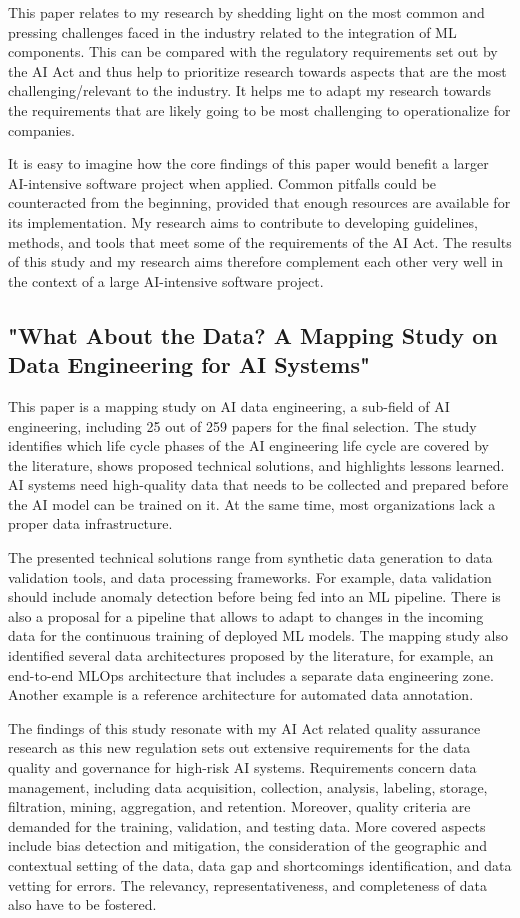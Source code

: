 \documentclass[titlepage,11pt]{article}
\begin{document}
This paper relates to my research by shedding light on the most common and pressing challenges faced in the industry related to the integration of ML components. This can be compared with the regulatory requirements set out by the AI Act and thus help to prioritize research towards aspects that are the most challenging/relevant to the industry. It helps me to adapt my research towards the requirements that are likely going to be most challenging to operationalize for companies. 

It is easy to imagine how the core findings of this paper would benefit a larger AI-intensive software project when applied. Common pitfalls could be counteracted from the beginning, provided that enough resources are available for its implementation. My research aims to contribute to developing guidelines, methods, and tools that meet some of the requirements of the AI Act. The results of this study and my research aims therefore complement each other very well in the context of a large AI-intensive software project.

\subsection{"What About the Data? A Mapping Study on Data Engineering for AI Systems"~\cite{heckWhatDataMapping2024a}}
This paper is a mapping study on AI data engineering, a sub-field of AI engineering, including 25 out of 259 papers for the final selection. The study identifies which life cycle phases of the AI engineering life cycle are covered by the literature, shows proposed technical solutions, and highlights lessons learned. AI systems need high-quality data that needs to be collected and prepared before the AI model can be trained on it. At the same time, most organizations lack a proper data infrastructure.

The presented technical solutions range from synthetic data generation to data validation tools, and data processing frameworks. For example, data validation should include anomaly detection before being fed into an ML pipeline. There is also a proposal for a pipeline that allows to adapt to changes in the incoming data for the continuous training of deployed ML models. 
The mapping study also identified several data architectures proposed by the literature, for example, an end-to-end MLOps architecture that includes a separate data engineering zone. Another example is a reference architecture for automated data annotation.

The findings of this study resonate with my AI Act related quality assurance research as this new regulation sets out extensive requirements for the data quality and governance for high-risk AI systems. Requirements concern data management, including data acquisition, collection, analysis, labeling, storage, filtration, mining, aggregation, and retention. Moreover, quality criteria are demanded for the training, validation, and testing data. More covered aspects include bias detection and mitigation, the consideration of the geographic and contextual setting of the data, data gap and shortcomings identification, and data vetting for errors. The relevancy, representativeness, and completeness of data also have to be fostered.
\end{document}
